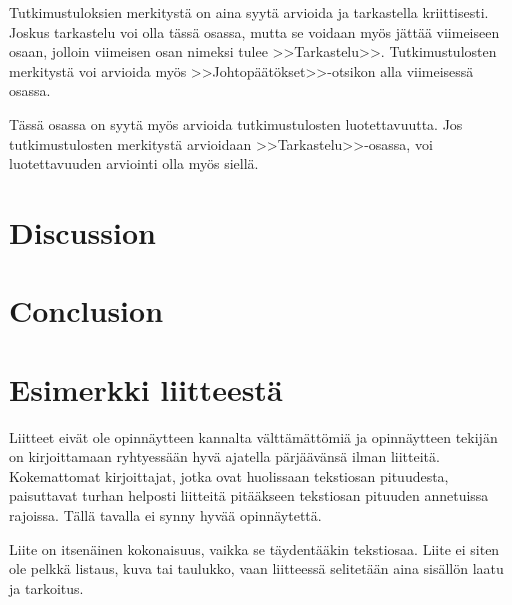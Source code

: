 \documentclass[english, 12pt, a4paper, elec, utf8, a-1b, online]{aaltothesis}
\begin{document}
Tutkimustuloksien merkityst\"a on aina syyt\"a arvioida ja tarkastella
kriittisesti.  Joskus tarkastelu voi olla t\"ass\"a osassa, mutta se
voidaan my\"os j\"att\"a\"a viimeiseen osaan, jolloin viimeisen osan nimeksi
tulee >>Tarkastelu>>. Tutkimustulosten merkityst\"a voi arvioida my\"os
>>Johtop\"a\"at\"okset>>-otsikon alla viimeisess\"a osassa. 

T\"ass\"a osassa on syyt\"a my\"os arvioida tutkimustulosten luotettavuutta.
Jos tutkimustulosten merkityst\"a arvioidaan >>Tarkastelu>>-osassa,
voi luotettavuuden arviointi olla my\"os siell\"a. 

\section{Discussion}

\clearpage

\section{Conclusion}

\clearpage

\thesisbibliography




\clearpage

\thesisappendix

\section{Esimerkki liitteest\"a\label{LiiteA}}

Liitteet eiv\"at ole opinn\"aytteen kannalta v\"altt\"am\"att\"omi\"a ja 
opinn\"aytteen tekij\"an on 
kirjoittamaan ryhtyess\"a\"an hyv\"a ajatella p\"arj\"a\"av\"ans\"a ilman liitteit\"a.
Kokemattomat kirjoittajat, jotka ovat huolissaan
tekstiosan pituudesta, paisuttavat turhan 
helposti liitteit\"a pit\"a\"akseen tekstiosan pituuden annetuissa rajoissa.
T\"all\"a tavalla ei synny hyv\"a\"a opinn\"aytett\"a.   

Liite on itsen\"ainen kokonaisuus, vaikka se t\"aydent\"a\"akin tekstiosaa.
Liite ei siten ole pelkk\"a listaus, kuva tai taulukko, vaan 
liitteess\"a selitet\"a\"an aina sis\"all\"on laatu ja tarkoitus. 
\end{document}
